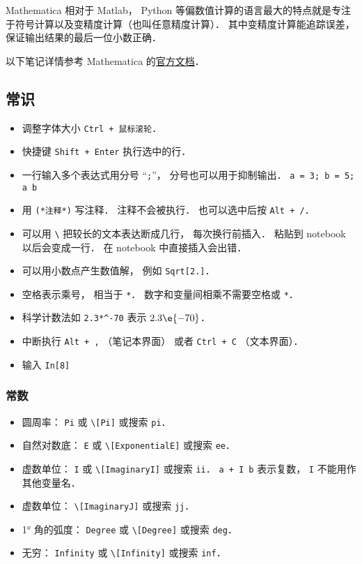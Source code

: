 

Mathematica 相对于 Matlab， Python 等偏数值计算的语言最大的特点就是专注于符号计算以及变精度计算（也叫任意精度计算）． 其中变精度计算能追踪误差， 保证输出结果的最后一位小数正确．

以下笔记详情参考 Mathematica 的\href{https://reference.wolfram.com/language/}{官方文档}．

\subsection{常识}
\begin{itemize}
\item 调整字体大小 \verb|Ctrl + 鼠标滚轮|．
\item 快捷键 \verb|Shift + Enter| 执行选中的行．
\item 一行输入多个表达式用分号 “\verb|;|”， 分号也可以用于抑制输出． \verb|a = 3; b = 5; a b|
\item 用 \verb|(*注释*)| 写注释． 注释不会被执行． 也可以选中后按 \verb|Alt + /|．
\item 可以用 \verb|\| 把较长的文本表达断成几行， 每次换行前插入． 粘贴到 notebook 以后会变成一行． 在 notebook 中直接插入会出错．
\item 可以用小数点产生数值解， 例如 \verb|Sqrt[2.]|．
\item 空格表示乘号， 相当于 \verb|*|． 数字和变量间相乘不需要空格或 \verb|*|．
\item 科学计数法如 \verb|2.3*^-70| 表示 $2.3\e{-70}$．
\item 中断执行 \verb|Alt + ,| （笔记本界面） 或者 \verb|Ctrl + C| （文本界面）．
\item 输入 \verb|In[8]|
\end{itemize}

\subsubsection{常数}

\begin{itemize}
\item 圆周率： \verb|Pi| 或 \verb|\[Pi]| 或搜索 \verb|pi|．
\item 自然对数底： \verb|E| 或 \verb|\[ExponentialE]| 或搜索 \verb|ee|．
\item 虚数单位： \verb|I| 或 \verb|\[ImaginaryI]| 或搜索 \verb|ii|． \verb|a + I b| 表示复数， \verb|I| 不能用作其他变量名．
\item 虚数单位： \verb|\[ImaginaryJ]| 或搜索 \verb|jj|．
\item 1° 角的弧度： \verb|Degree| 或 \verb|\[Degree]| 或搜索 \verb|deg|．
\item 无穷： \verb|Infinity| 或 \verb|\[Infinity]| 或搜索 \verb|inf|．
\end{itemize}

